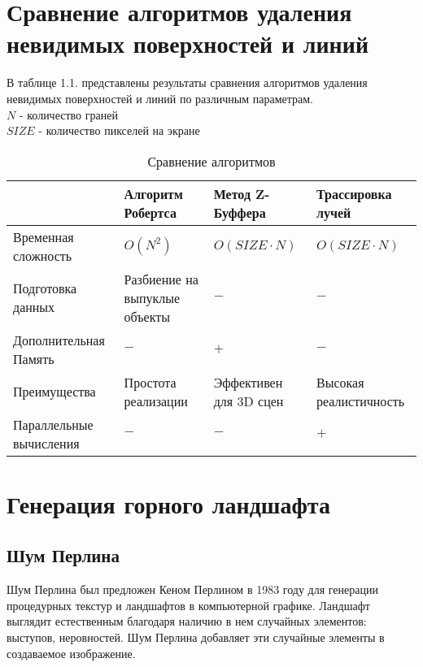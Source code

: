 \section{Сравнение алгоритмов удаления невидимых поверхностей и линий}
В таблице 1.1. представлены результаты сравнения алгоритмов удаления невидимых поверхностей и линий по различным параметрам. \\
$N$ - количество граней \\
$SIZE$ - количество пикселей на экране \\ 

\begin{table}[H]
	\begin{center}
        \small
		\caption{Сравнение алгоритмов}
		\label{tbl:comparing_algorithms}
		\begin{tabular}{
              |p{2.5in}| %
              >{\centering\arraybackslash}m{1in}|
              >{\centering\arraybackslash}m{1in}|
              >{\centering\arraybackslash}m{1.25in}|
              }
			 \hline
              & \textbf{Алгоритм Робертса} & \textbf{Метод Z-Буффера} & \textbf{Трассировка лучей} \\
             \hline
             Временная сложность & $O(N^2)$ & $O(SIZE \cdot N)$ & $O(SIZE \cdot N)$ \\
             \hline
             Подготовка данных & Разбиение на выпуклые объекты & $-$ & $-$ \\
             \hline
             Дополнительная Память & $-$ & $+$ & $-$ \\
             \hline
             Преимущества & Простота реализации & Эффективен для 3D сцен & Высокая реалистичность \\
             \hline
             Параллельные вычисления & $-$ & $-$ & $+$ \\ 
             \hline
		\end{tabular}
	\end{center}
\end{table}

\section{Генерация горного ландшафта}
\subsection{Шум Перлина}
Шум Перлина был предложен Кеном Перлином в 1983 году для генерации процедурных текстур и ландшафтов в компьютерной графике. Ландшафт выглядит естественным благодаря наличию в нем случайных элементов: выступов, неровностей. Шум Перлина добавляет эти случайные элементы в создаваемое изображение.


